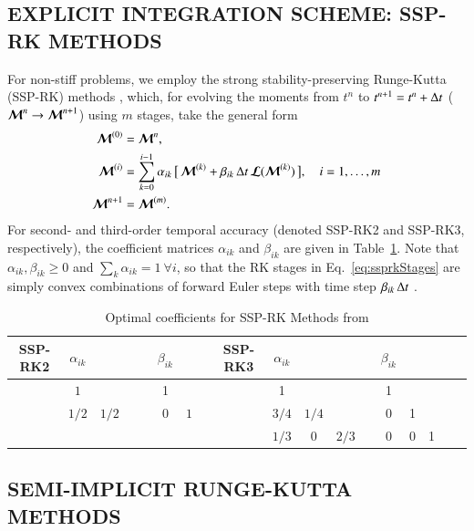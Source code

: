 \documentclass[11pt,letterpaper,twoside,english,final]{article}
\begin{document}
\subsection{EXPLICIT INTEGRATION SCHEME: SSP-RK METHODS}
\label{sec:explicitTime}

For non-stiff problems, we employ the strong stability-preserving Runge-Kutta (SSP-RK) methods \citep[e.g.,][]{gottlieb_etal_2001}, which, for evolving the moments from $t^{n}$ to $t^{n+1}=t^{n}+\Delta t$ ($\boldsymbol{\mathcal{M}}^{n}\to\boldsymbol{\mathcal{M}}^{n+1}$) using $m$ stages, take the general form
\begin{align}
  \boldsymbol{\mathcal{M}}^{(0)}
  &=\boldsymbol{\mathcal{M}}^{n}, \\
  \boldsymbol{\mathcal{M}}^{(i)}
  &=\sum_{k=0}^{i-1}\alpha_{ik}\,\big[\,\boldsymbol{\mathcal{M}}^{(k)}+\beta_{ik}\,\Delta t\,\boldsymbol{\mathcal{L}}(\boldsymbol{\mathcal{M}}^{(k)})\,\big], \quad i=1,\ldots,m 
  \label{eq:ssprkStages} \\
  \boldsymbol{\mathcal{M}}^{n+1}
  &=\boldsymbol{\mathcal{M}}^{(m)}.  
\end{align}
For second- and third-order temporal accuracy (denoted SSP-RK2 and SSP-RK3, respectively), the coefficient matrices $\alpha_{ik}$ and $\beta_{ik}$ are given in Table~\ref{tab:ssprkCoefficients}.  
Note that $\alpha_{ik},\beta_{ik}\ge0$ and $\sum_{k}\alpha_{ik}=1~\forall i$, so that the RK stages in Eq.~\eqref{eq:ssprkStages} are simply convex combinations of forward Euler steps with time step $\beta_{ik}\,\Delta t$ \citep{shuOsher_1988}.  

\begin{table}[h]
  \caption{Optimal coefficients for SSP-RK Methods from \citet{shuOsher_1988} \label{tab:ssprkCoefficients}}
  \small
  \vspace{-6pt}
  \begin{center}
  \begin{tabular}{cccccccccccccccccc}
    \midrule
     SSP-RK2 & $\alpha_{ik}$ & & & & $\beta_{ik}$ & & & SSP-RK3 & $\alpha_{ik}$ & & & & $\beta_{ik}$ \\
    \midrule
    \midrule
      & $1$ & & & & 1 & & & & 1 & & & & 1 \\  
      & $1/2$ & $1/2$ & & & $0$ & $1$ & & & $3/4$ & $1/4$ & & & 0 & 1  \\
      & & & & & & & & & $1/3$ & 0 & $2/3$ & & 0 & 0 & 1 \\ 
    \midrule
    \midrule
  \end{tabular}
  \end{center}
\end{table}

\subsection{SEMI-IMPLICIT RUNGE-KUTTA METHODS}
\label{sec:semiImplicitTime}
\end{document}
